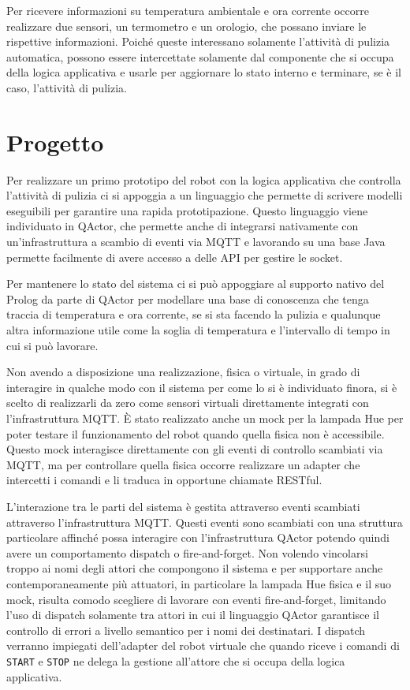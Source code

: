 Per ricevere informazioni su temperatura ambientale e ora corrente occorre realizzare due sensori, un termometro e un orologio, che possano inviare le rispettive informazioni. Poiché queste interessano solamente l'attività di pulizia automatica, possono essere intercettate solamente dal componente che si occupa della logica applicativa e usarle per aggiornare lo stato interno e terminare, se è il caso, l'attività di pulizia.

\section{Progetto}
Per realizzare un primo prototipo del robot con la logica applicativa che controlla l'attività di pulizia ci si appoggia a un linguaggio che permette di scrivere modelli eseguibili per garantire una rapida prototipazione. Questo linguaggio viene individuato in QActor, che permette anche di integrarsi nativamente con un'infrastruttura a scambio di eventi via MQTT e lavorando su una base Java permette facilmente di avere accesso a delle API per gestire le socket.

Per mantenere lo stato del sistema ci si può appoggiare al supporto nativo del Prolog da parte di QActor per modellare una base di conoscenza che tenga traccia di temperatura e ora corrente, se si sta facendo la pulizia e qualunque altra informazione utile come la soglia di temperatura e l'intervallo di tempo in cui si può lavorare.

Non avendo a disposizione una realizzazione, fisica o virtuale, in grado di interagire in qualche modo con il sistema per come lo si è individuato finora, si è scelto di realizzarli da zero come sensori virtuali direttamente integrati con l'infrastruttura MQTT. È stato realizzato anche un mock per la lampada Hue per poter testare il funzionamento del robot quando quella fisica non è accessibile. Questo mock interagisce direttamente con gli eventi di controllo scambiati via MQTT, ma per controllare quella fisica occorre realizzare un adapter che intercetti i comandi e li traduca in opportune chiamate RESTful.

L'interazione tra le parti del sistema è gestita attraverso eventi scambiati attraverso l'infrastruttura MQTT. Questi eventi sono scambiati con una struttura particolare affinché possa interagire con l'infrastruttura QActor potendo quindi avere un comportamento dispatch o fire-and-forget. Non volendo vincolarsi troppo ai nomi degli attori che compongono il sistema e per supportare anche contemporaneamente più attuatori, in particolare la lampada Hue fisica e il suo mock, risulta comodo scegliere di lavorare con eventi fire-and-forget, limitando l'uso di dispatch solamente tra attori in cui il linguaggio QActor garantisce il controllo di errori a livello semantico per i nomi dei destinatari. I dispatch verranno impiegati dell'adapter del robot virtuale che quando riceve i comandi di \texttt{START} e \texttt{STOP} ne delega la gestione all'attore che si occupa della logica applicativa.

